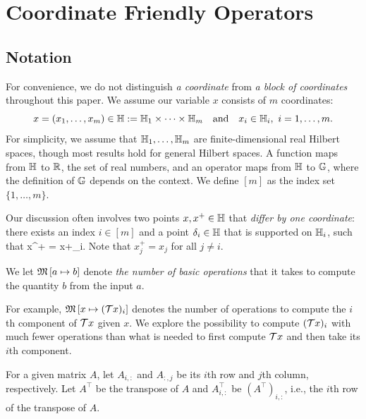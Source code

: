 \section{Coordinate Friendly Operators}\label{sec:cuf}

\subsection{Notation}
For convenience, we do not distinguish \emph{a coordinate} from \emph{a block of coordinates} throughout this paper. We assume our variable $x$ consists of $m$ coordinates: $$x = (x_1, \ldots, x_m) \in\mathbb{H} := \mathbb{H}_1 \times \cdots \times \mathbb{H}_m\quad\mbox{and}\quad x_i\in\mathbb{H}_i,~ i=1,\ldots,m.$$ For simplicity, we assume that $\mathbb{H}_1,\ldots,\mathbb{H}_m$ are finite-dimensional real Hilbert spaces, though most results hold for general Hilbert spaces.
A function maps from $\mathbb{H}$ to $\mathbb{R}$, the set of real numbers, and an operator maps from $\mathbb{H}$ to $\mathbb{G}$, where the definition of $\mathbb{G}$ depends on the context. We define $[m]$ as the index set $\{1, \ldots, m\}$.

Our discussion often involves two points $x,x^+\in\mathbb{H}$ that \emph{differ by one coordinate}: there exists an index $i\in [m]$ and a point $\delta_i\in\mathbb{H}$ that is supported on $\mathbb{H}_i$, such that
\beq\label{singleupdate}
x^+ = x+\delta_i.
\eeq
Note that $x^+_j=x_j$ for all $j\not=i$. 
\begin{definition}
We let $\mathfrak{M}\left[{a}\mapsto {b}\right]$ denote \emph{the number of basic operations} that it takes to compute the quantity $b$ from the  input $a$.
\end{definition}
For example, $\mathfrak{M}\left[{x}\mapsto {({\mathcal{T}}x)_i}\right]$ denotes the number of operations to compute the $i$th component of ${\mathcal{T}} x$ given $x$. We explore the possibility to compute  $({\mathcal{T}} x)_i$ with much fewer operations than what is needed to first compute ${\mathcal{T}} x$ and  then take its $i$th component. %

For a given matrix $A$, let $A_{i,:}$ and $A_{:,j}$ be its $i$th row and $j$th column, respectively. Let $A^\top$ be the transpose of $A$ and $A^\top_{i,:}$ be $(A^\top)_{i,:}$, i.e., the $i$th row of the transpose of $A$. 

